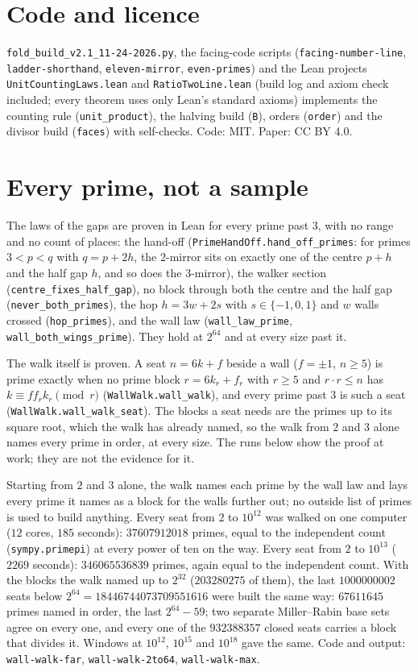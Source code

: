 \documentclass[11pt]{article}
\begin{document}
\section*{Code and licence}
{\sloppy\texttt{fold\_build\_v2.1\_11-24-2026.py}, the facing-code scripts (\texttt{facing-number-line}, \texttt{ladder-shorthand}, \texttt{eleven-mirror}, \texttt{even-primes}) and the Lean projects \texttt{UnitCountingLaws.lean} and \texttt{RatioTwoLine.lean} (build log and axiom check included; every theorem uses only Lean's standard axioms) implements the counting rule (\texttt{unit\_product}), the halving build (\texttt{B}), orders (\texttt{order}) and the divisor build (\texttt{faces}) with self-checks. Code: MIT. Paper: CC BY 4.0.\par}

\section{Every prime, not a sample}
The laws of the gaps are proven in Lean for every prime past $3$, with no range and no count of places: the hand-off (\texttt{PrimeHandOff.hand\_off\_primes}: for primes $3<p<q$ with $q = p+2h$, the $2$-mirror sits on exactly one of the centre $p+h$ and the half gap $h$, and so does the $3$-mirror), the walker section (\texttt{centre\_fixes\_half\_gap}), no block through both the centre and the half gap (\texttt{never\_both\_primes}), the hop $h = 3w + 2s$ with $s\in\{-1,0,1\}$ and $w$ walls crossed (\texttt{hop\_primes}), and the wall law (\texttt{wall\_law\_prime}, \texttt{wall\_both\_wings\_prime}). They hold at $2^{64}$ and at every size past it.

The walk itself is proven. A seat $n = 6k+f$ beside a wall ($f=\pm1$, $n\ge5$) is prime exactly when no prime block $r = 6k_r+f_r$ with $r\ge5$ and $r\cdot r\le n$ has $k\equiv f f_r k_r \pmod r$ (\texttt{WallWalk.wall\_walk}), and every prime past $3$ is such a seat (\texttt{WallWalk.wall\_walk\_seat}). The blocks a seat needs are the primes up to its square root, which the walk has already named, so the walk from $2$ and $3$ alone names every prime in order, at every size. The runs below show the proof at work; they are not the evidence for it.

Starting from $2$ and $3$ alone, the walk names each prime by the wall law and lays every prime it names as a block for the walls further out; no outside list of primes is used to build anything. Every seat from $2$ to $10^{12}$ was walked on one computer ($12$ cores, $185$ seconds): $37607912018$ primes, equal to the independent count (\texttt{sympy.primepi}) at every power of ten on the way. Every seat from $2$ to $10^{13}$ ($2269$ seconds): $346065536839$ primes, again equal to the independent count. With the blocks the walk named up to $2^{32}$ ($203280275$ of them), the last $1000000002$ seats below $2^{64} = 18446744073709551616$ were built the same way: $67611645$ primes named in order, the last $2^{64}-59$; two separate Miller--Rabin base sets agree on every one, and every one of the $932388357$ closed seats carries a block that divides it. Windows at $10^{12}$, $10^{15}$ and $10^{18}$ gave the same. Code and output: \texttt{wall-walk-far}, \texttt{wall-walk-2to64}, \texttt{wall-walk-max}.
\end{document}
